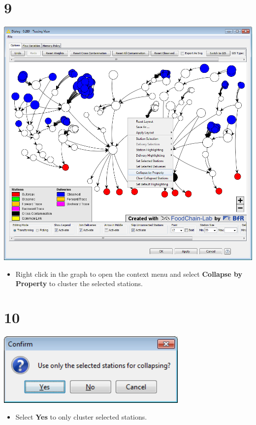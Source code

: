 \documentclass{beamer}
\begin{document}
\section{9}
\begin{frame}
	\begin{center}
  		\includegraphics[height=0.6\textheight]{9.png}
	\end{center}
	\begin{itemize}
		\item Right click in the graph to open the context menu and select \textbf{Collapse by Property} to cluster the selected stations.
	\end{itemize}
\end{frame}

\section{10}
\begin{frame}
	\begin{center}
  		\includegraphics[width=0.7\textwidth]{10.png}
	\end{center}
	\begin{itemize}
		\item Select \textbf{Yes} to only cluster selected stations.
	\end{itemize}
\end{frame}
\end{document}

